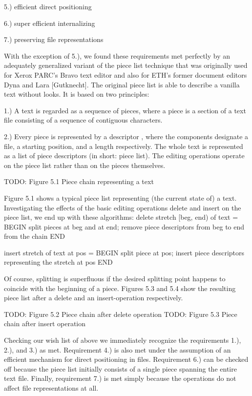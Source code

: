 5.) efficient direct positioning

6.) super efficient internalizing

7.) preserving file representations

\noindent With the exception of 5.), we found these requirements met
perfectly by an adequately generalized variant of the piece list
technique that was originally used for Xerox PARC's Bravo text editor
and also for ETH's former document editors Dyna and Lara
[Gutknecht]. The original piece list is able to describe a vanilla
text without looks. It is based on two principles:


1.) A text is regarded as a sequence of pieces, where a piece is a
section of a text file consisting of a sequence of contiguous
characters.

2.) Every piece is represented by a descriptor , where
the components designate a file, a starting position, and a length
respectively. The whole text is represented as a list of piece
descriptors (in short: piece list). The editing operations operate on
the piece list rather than on the pieces themselves.

TODO: Figure 5.1 Piece chain representing a text

Figure 5.1 shows a typical piece list representing (the current state
of) a text. Investigating the effects of the basic editing operations
delete and insert on the piece list, we end up with these algorithms:
\begintt
delete stretch [beg, end) of text = BEGIN
  split pieces at beg and at end;
  remove piece descriptors from beg to end from the chain
END
  
insert stretch of text at pos = BEGIN
  split piece at pos;
  insert piece descriptors representing the stretch at pos
END
\endtt

\noindent Of course, splitting is superfluous if the desired splitting point
happens to coincide with the beginning of a piece. Figures 5.3 and 5.4
show the resulting piece list after a delete and an insert-operation
respectively.

TODO: Figure 5.2 Piece chain after delete operation
TODO: Figure 5.3 Piece chain after insert operation

Checking our wish list of above we immediately recognize the
requirements 1.), 2.), and 3.) as met. Requirement 4.) is also met
under the assumption of an efficient mechanism for direct positioning
in files. Requirement 6.) can be checked off because the piece list
initially consists of a single piece spanning the entire text
file. Finally, requirement 7.) is met simply because the operations do
not affect file representations at all.

